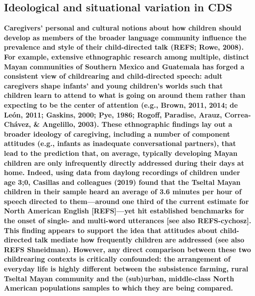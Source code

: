 \documentclass[,man,floatsintext]{apa6}
\begin{document}
\subsection{Ideological and situational variation in
CDS}\label{ideological-and-situational-variation-in-cds}

\textbf{Caregivers' personal and cultural notions about how children
should develop as members of the broader language community influence
the prevalence and style of their child-directed talk (REFS; Rowe,
2008). For example, extensive ethnographic research among multiple,
distinct Mayan communities of Southern Mexico and Guatemala has forged a
consistent view of childrearing and child-directed speech: adult
caregivers shape infants' and young children's worlds such that children
learn to attend to what is going on around them rather than expecting to
be the center of attention (e.g., Brown, 2011, 2014; de León, 2011;
Gaskins, 2000; Pye, 1986; Rogoff, Paradise, Arauz, Correa-Chávez, \&
Angelillo, 2003). These ethnographic findings lay out a broader ideology
of caregiving, including a number of component attitudes (e.g., infants
as inadequate conversational partners), that lead to the prediction
that, on average, typically developing Mayan children are only
infrequently directly addressed during their days at home. Indeed, using
data from daylong recordings of children under age 3;0, Casillas and
colleagues (2019) found that the Tseltal Mayan children in their sample
heard an average of 3.6 minutes per hour of speech directed to
them---around one third of the current estimate for North American
English {[}REFS{]}---yet hit established benchmarks for the onset of
single- and multi-word utterances {[}see also REFS-cychosz{]}. This
finding appears to support the idea that attitudes about child-directed
talk mediate how frequently children are addressed (see also REFS
Shneidman). However, any direct comparison between these two
childrearing contexts is critically confounded: the arrangement of
everyday life is highly different between the subsistence farming, rural
Tseltal Mayan community and the (sub)urban, middle-class North American
populations samples to which they are being compared.}
\end{document}
